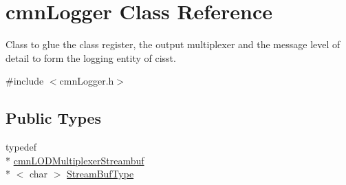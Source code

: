 \hypertarget{classcmn_logger}{\section{cmn\-Logger Class Reference}
\label{classcmn_logger}
}


Class to glue the class register, the output multiplexer and the message level of detail to form the logging entity of cisst.  




{\ttfamily \#include $<$cmn\-Logger.\-h$>$}

\subsection*{Public Types}
\begin{DoxyCompactItemize}
\item 
typedef \\*
\hyperlink{classcmn_l_o_d_multiplexer_streambuf}{cmn\-L\-O\-D\-Multiplexer\-Streambuf}\\*
$<$ char $>$ \hyperlink{classcmn_logger_a7d192777882d1dc6bb48ceac0b4e65bb}{Stream\-Buf\-Type}
\end{DoxyCompactItemize}
